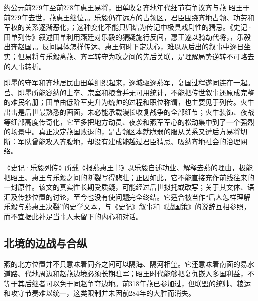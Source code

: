 \begin{event}{约公元前279年至前278年}{惠王易将，田单收复齐地}{年代细节有争议}{齐与燕}
昭王于前279年去世，燕惠王继位，。乐毅仍在远方的占领区，君臣围绕齐地占领、功劳和军权的关系逐渐恶化，；这种变化不能只归结为传记中极具戏剧性的猜忌。《史记·田单列传》叙述田单利用燕廷对乐毅的猜疑施行反间，惠王遂以骑劫代将，，乐毅出奔赵国，。反间具体怎样传达、惠王何时下定决心，难以从后出的叙事中逐日坐实；但易将与乐毅离燕、齐军转守为攻之间的先后关联，是理解局势逆转不可略去的人事转折。

即墨的守军和齐地居民由田单组织起来，逐城驱逐燕军，复国过程遂同连在一起。莒、即墨所能容纳的士卒、宗室和粮食并无可用统计，不能把传世叙事还原成完整的难民名册；田单由低阶军吏升为统帅的过程和职位称谓，也主要见于列传。火牛出击是后世最熟悉的画面，未必能承载漫长收复战争的全部细节；火牛装饰、夜战等细部高度传奇化，它至多把地方动员、夜袭和燕军军心的松动集中到了一个强烈的场景中。真正决定燕国败退的，是占领区本就脆弱的服从关系又遭后方易将切断：军队曾能攻入齐腹地，却没有建成能越过君臣猜忌、吸纳齐地社会的治理网络。
\end{event}

\begin{sourcenote}[乐毅书信与燕国故事]
《史记·乐毅列传》所载《报燕惠王书》以乐毅自述功业、解释去燕的理由，极能把昭王、惠王与乐毅之间的断裂写得悲壮；正因如此，它不能直接充作前线往来的一封原件。该文的真实性长期受质疑，可能经过后世拟托或改写；关于其文体、语汇及传抄位置的讨论，至今也没有使问题完全终结。它适合被当作“后人怎样理解乐毅与燕惠王决裂”的史学文本，与《史记》叙事和《战国策》的说辞互相参照，而不宜据此补足当事人未留下的内心和对话。
\end{sourcenote}

\subsection{北境的边战与合纵}

燕的北方位置并不只意味着同齐之间可以隔海、隔河相望。它还意味着南面的易水道路、代地周边和赵燕边境必须长期驻军；昭王时代能够把复仇嵌入多国利益，不等于其后继者可以免于同赵争夺边地。前318年燕已参加过，但联盟的统帅、粮运和攻守节奏难以统一，这类限制并未因前284年的大胜而消失。

